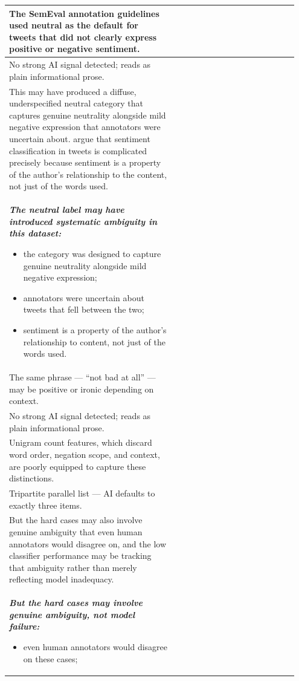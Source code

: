 \documentclass[11pt]{article}
\begin{document}
\begin{longtable}{|p{0.55\linewidth}|p{0.40\linewidth}|}
\hline
The SemEval annotation guidelines used neutral as the default for tweets that did not clearly express positive or negative sentiment. & \\[2pt]
\hline
No strong AI signal detected; reads as plain informational prose. & \\
\hline
This may have produced a diffuse, underspecified neutral category that captures genuine neutrality alongside mild negative expression that annotators were uncertain about. argue that sentiment classification in tweets is complicated precisely because sentiment is a property of the author's relationship to the content, not just of the words used. & \\[2pt]
\hline
{\bfseries\itshape The neutral label may have introduced systematic ambiguity in this dataset:
\begin{itemize}[leftmargin=*,topsep=2pt,itemsep=1pt,parsep=0pt]
  \item the category was designed to capture genuine neutrality alongside mild negative expression;
  \item annotators were uncertain about tweets that fell between the two;
  \item sentiment is a property of the author's relationship to content, not just of the words used.
\end{itemize}}\vspace{2em} & \\
\hline
The same phrase --- ``not bad at all'' --- may be positive or ironic depending on context. & \\[2pt]
\hline
No strong AI signal detected; reads as plain informational prose. & \\
\hline
Unigram count features, which discard word order, negation scope, and context, are poorly equipped to capture these distinctions. & \\[2pt]
\hline
Tripartite parallel list --- AI defaults to exactly three items. & \\
\hline
But the hard cases may also involve genuine ambiguity that even human annotators would disagree on, and the low classifier performance may be tracking that ambiguity rather than merely reflecting model inadequacy. & \\[2pt]
\hline
{\bfseries\itshape But the hard cases may involve genuine ambiguity, not model failure:
\begin{itemize}[leftmargin=*,topsep=2pt,itemsep=1pt,parsep=0pt]
  \item even human annotators would disagree on these cases;

\end{itemize}}
\end{longtable}
\end{document}
